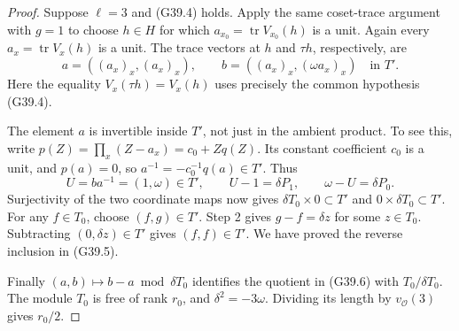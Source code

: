 \begin{proof}
Suppose $\ell=3$ and (G39.4) holds.  Apply the same
coset-trace argument with $g=1$ to choose $h\in H$ for
which $a_{x_0}=\operatorname{tr}V_{x_0}(h)$ is a unit.
Again every $a_x=\operatorname{tr}V_x(h)$ is a unit.
The trace vectors at $h$ and $\tau h$, respectively, are
\[
                a=((a_x)_x,(a_x)_x),\qquad
                b=((a_x)_x,(\omega a_x)_x)\quad\text{in }T'.
                                                               \tag{G39.8}
\]
Here the equality $V_x(\tau h)=V_x(h)$ uses precisely
the common hypothesis (G39.4).

The element $a$ is invertible inside $T'$, not just in the
ambient product.  To see this, write
$p(Z)=\prod_x(Z-a_x)=c_0+Zq(Z)$.  Its constant coefficient
$c_0$ is a unit, and $p(a)=0$, so
$a^{-1}=-c_0^{-1}q(a)\in T'$.
Thus
\[
                 U=ba^{-1}=(1,\omega)\in T',\qquad
                 U-1=\delta P_1,\qquad
                 \omega-U=\delta P_0.                       \tag{G39.9}
\]
Surjectivity of the two coordinate maps now gives
$\delta T_0\times0\subset T'$ and $0\times\delta T_0\subset T'$.
For any $f\in T_0$, choose $(f,g)\in T'$.  Step 2 gives
$g-f=\delta z$ for some $z\in T_0$.  Subtracting
$(0,\delta z)\in T'$ gives $(f,f)\in T'$.
We have proved the reverse inclusion in (G39.5).

Finally $(a,b)\mapsto b-a\bmod\delta T_0$ identifies the
quotient in (G39.6) with $T_0/\delta T_0$.  The module
$T_0$ is free of rank $r_0$, and $\delta^2=-3\omega$.
Dividing its length by $v_{\mathcal O}(3)$ gives $r_0/2$.
\end{proof}

